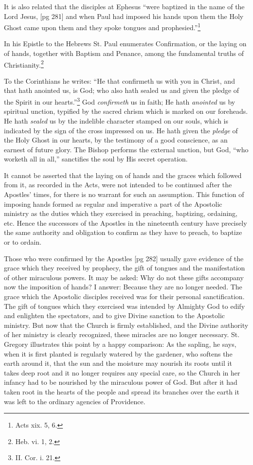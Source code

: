 It is also related that the disciples at Ephesus
“were baptized in the name of the Lord Jesus,
[pg 281]
and when Paul had imposed his hands upon them
the Holy Ghost came upon them and they spoke
tongues and prophesied.”\footnote{Acts xix. 5, 6.}

In his Epistle to the Hebrews St. Paul enumerates
Confirmation, or the laying on of hands,
together with Baptism and Penance, among the
fundamental truths of Christianity.\footnote{Heb. vi. 1, 2.}

To the Corinthians he writes: “He that confirmeth
us with you in Christ, and that hath
anointed us, is God; who also hath sealed us and
given the pledge of the Spirit in our hearts.”\footnote{II.
Cor. i. 21.} God \emph{confirmeth} us in faith; He hath
\emph{anointed} us by spiritual unction, typified by the sacred chrism
which is marked on our foreheads. He hath \emph{sealed}
us by the indelible character stamped on our souls,
which is indicated by the sign of the cross impressed
on us. He hath given the \emph{pledge} of the
Holy Ghost in our hearts, by the testimony of a
good conscience, as an earnest of future glory.
The Bishop performs the external unction, but
God, “who worketh all in all,” sanctifies the soul
by His secret operation.

It cannot be asserted that the laying on of hands
and the graces which followed from it, as recorded
in the Acts, were not intended to be continued
after the Apostles' times, for there is no warrant
for such an assumption. This function of imposing
hands formed as regular and imperative a part
of the Apostolic ministry as the duties which they
exercised in preaching, baptizing, ordaining, etc.
Hence the successors of the Apostles in the nineteenth
century have precisely the same authority
and obligation to confirm as they have to preach,
to baptize or to ordain.

Those who were confirmed by the Apostles
[pg 282]
usually gave evidence of the grace which they received
by prophecy, the gift of tongues and the
manifestation of other miraculous powers. It may
be asked: Why do not these gifts accompany now
the imposition of hands? I answer: Because they
are no longer needed. The grace which the Apostolic
disciples received was for their personal
sanctification. The gift of tongues which they
exercised was intended by Almighty God to edify
and enlighten the spectators, and to give Divine
sanction to the Apostolic ministry. But now that
the Church is firmly established, and the Divine
authority of her ministry is clearly recognized,
these miracles are no longer necessary. St. Gregory
illustrates this point by a happy comparison:
As the sapling, he says, when it is first planted
is regularly watered by the gardener, who softens
the earth around it, that the sun and the moisture
may nourish its roots until it takes deep root and
it no longer requires any special care, so the
Church in her infancy had to be nourished by the
miraculous power of God. But after it had taken
root in the hearts of the people and spread its
branches over the earth it was left to the ordinary
agencies of Providence.

